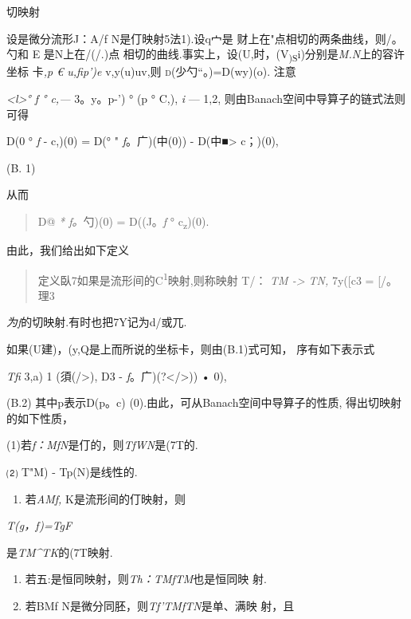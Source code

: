\documentclass{article}
\begin{document}
切映射

设是微分流形J：A/f N是仃映射5法1).设q宀是
财上在"点相切的两条曲线，则/。勺和 E 是N上在/(/.)点
相切的曲线.事实上，设(U,时，(V\textsubscript{)S}i)分别是\emph{M.N}上的容许坐标
卡\emph{,p € u,fip')e} v,y(u)uv,则 \textsc{d}(少勺``。)=D(wy)(o). 注意

\emph{\textless{}l\textgreater{}° f ° c,---} 3。y。p-') ° (p ° C,),
\emph{i} --- 1,2, 则由Banach空间中导算子的链式法则可得

D(0 ° \emph{f} - c,)(0) = D(° " \emph{f}。广)(中(0)) -
D(中■\textgreater{} c；)(0),

(B. 1)

从而

\begin{quote}
D@ \emph{* f。}勺)(0) = D((J。\emph{f} ° c\textsubscript{z})(0).
\end{quote}

由此，我们给出如下定义

\begin{quote}
定义臥7如果是流形间的C\textsuperscript{1}映射,则称映射 T/： \emph{TM
-\textgreater{} TN,} 7y({[}c3 = {[}/。理3
\end{quote}

\emph{为f}的切映射.有时也把7Y记为d/或兀.

如果(U建)，(y,Q是上而所说的坐标卡，则由(B.1)式可知， 序有如下表示式

\emph{Tfi} 3,a) 1 (須(/\textgreater{}), D3 -
\emph{f}。广)(?\textless{}/\textgreater{})) • 0),

(B.2) 其中p表示D(p。c) (0).由此，可从Banach空间中导算子的性质,
得出切映射的如下性质，

(1)若\emph{f：MfN}是仃的，则\emph{TfWN}是(7T的.

⑵ T"M) - Tp(N)是线性的.

\begin{enumerate}
\def\labelenumi{(\arabic{enumi})}
\setcounter{enumi}{2}
\item
  若\emph{AMf,} K是流形间的仃映射，则
\end{enumerate}

\emph{T(g，f)=TgF}

是\emph{TM\^{}TK}的(7T映射.

\begin{enumerate}
\def\labelenumi{(\arabic{enumi})}
\setcounter{enumi}{3}
\item
  若五:是恒同映射，则\emph{Th：TMfTM}也是恒同映 射.
\item
  若BMf N是微分同胚，则\emph{Tf'TMfTN}是单、满映 射，且
\end{enumerate}
\end{document}
